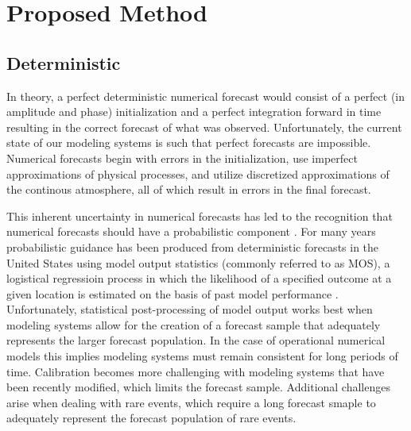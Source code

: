 

\chapter{Proposed Method}
\label{method}


\section{Deterministic}
\label{dmethod}

In theory, a perfect deterministic numerical forecast would consist of a perfect (in amplitude and phase) initialization and a perfect integration forward in time resulting in the correct forecast of what was observed. Unfortunately, the current state of our modeling systems is such that perfect forecasts are impossible. Numerical forecasts begin with errors in the initialization, use imperfect approximations of physical processes, and utilize discretized approximations of the continous atmosphere, all of which result in errors in the final forecast.

This inherent uncertainty in numerical forecasts has led to the recognition that numerical forecasts should have a probabilistic component \citep{ADD}. For many years probabilistic guidance has been produced from deterministic forecasts in the United States using model output statistics (commonly referred to as MOS), a logistical regressioin process in which the likelihood of a specified outcome at a given location is estimated on the basis of past model performance \citep{Glahn1972}. Unfortunately, statistical post-processing of model output works best when modeling systems allow for the creation of a forecast sample that adequately represents the larger forecast population. In the case of operational numerical models this implies modeling systems must remain consistent for long periods of time. Calibration becomes more challenging with modeling systems that have been recently modified, which limits the forecast sample. Additional challenges arise when dealing with rare events, which require a long forecast smaple to adequately represent the forecast population of rare events.

